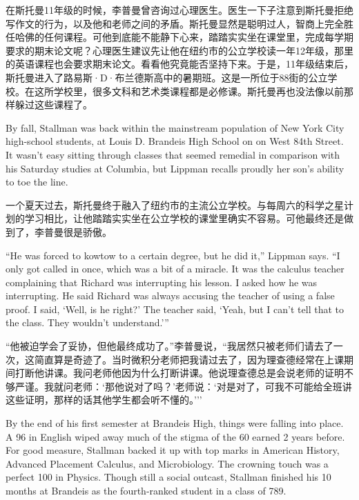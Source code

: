\ifdefined\chs
在斯托曼11年级的时候，李普曼曾咨询过心理医生。医生一下子注意到斯托曼拒绝写作文的行为，以及他和老师之间的矛盾。斯托曼显然是聪明过人，智商上完全胜任哈佛的任何课程。可他到底能不能静下心来，踏踏实实坐在课堂里，完成每学期要求的期末论文呢？心理医生建议先让他在纽约市的公立学校读一年12年级，那里的英语课程也会要求期末论文。看看他究竟能否坚持下来。于是，11年级结束后，斯托曼进入了路易斯·D·布兰德斯高中的暑期班。这是一所位于88街的公立学校。在这所学校里，很多文科和艺术类课程都是必修课。斯托曼再也没法像以前那样躲过这些课程了。
\fi

\ifdefined\eng
By fall, Stallman was back within the mainstream population of New York City high-school students, at Louis D. Brandeis High School on on West 84th Street. It wasn't easy sitting through classes that seemed remedial in comparison with his Saturday studies at Columbia, but Lippman recalls proudly her son's ability to toe the line.
\fi

\ifdefined\chs
一个夏天过去，斯托曼终于融入了纽约市的主流公立学校。与每周六的科学之星计划的学习相比，让他踏踏实实坐在公立学校的课堂里确实不容易。可他最终还是做到了，李普曼很是骄傲。
\fi

\ifdefined\eng
``He was forced to kowtow to a certain degree, but he did it,'' Lippman says. ``I only got called in once, which was a bit of a miracle. It was the calculus teacher complaining that Richard was interrupting his lesson. I asked how he was interrupting. He said Richard was always accusing the teacher of using a false proof. I said, `Well, is he right?' The teacher said, `Yeah, but I can't tell that to the class. They wouldn't understand.'\hspace{0.01in}''
\fi

\ifdefined\chs
``他被迫学会了妥协，但他最终成功了。''李普曼说，``我居然只被老师们请去了一次，这简直算是奇迹了。当时微积分老师把我请过去了，因为理查德经常在上课期间打断他讲课。我问老师他因为什么打断讲课。他说理查德总是会说老师的证明不够严谨。我就问老师：`那他说对了吗？'老师说：`对是对了，可我不可能给全班讲这些证明，那样的话其他学生都会听不懂的。'\hspace{0.01in}''
\fi

\ifdefined\eng
By the end of his first semester at Brandeis High, things were falling into place. A 96 in English wiped away much of the stigma of the 60 earned 2 years before. For good measure, Stallman backed it up with top marks in American History, Advanced Placement Calculus, and Microbiology. The crowning touch was a perfect 100 in Physics. Though still a social outcast, Stallman finished his 10 months at Brandeis as the fourth-ranked student in a class of 789.
\fi

